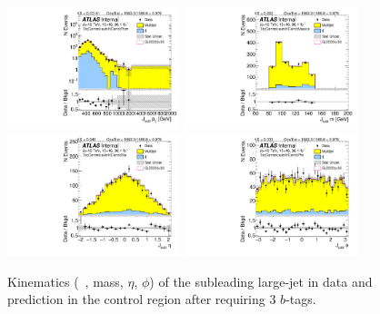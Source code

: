 \begin{figure}[htbp!]
\begin{center}
\includegraphics[width=0.45\textwidth,angle=-90]{figures/boosted/Control/b77_ThreeTag_Control_sublHCand_Pt_m_1.pdf}
\includegraphics[width=0.45\textwidth,angle=-90]{figures/boosted/Control/b77_ThreeTag_Control_sublHCand_Mass_s.pdf}\\
\includegraphics[width=0.45\textwidth,angle=-90]{figures/boosted/Control/b77_ThreeTag_Control_sublHCand_Eta.pdf}
\includegraphics[width=0.45\textwidth,angle=-90]{figures/boosted/Control/b77_ThreeTag_Control_sublHCand_Phi.pdf}
  \caption{Kinematics (\pt~, mass, $\eta$, $\phi$) of the subleading large-\R jet in data and prediction in the control region after requiring 3 $b$-tags. }
  \label{fig:boosted-3b-control-ak10-subl}
\end{center}
\end{figure}

